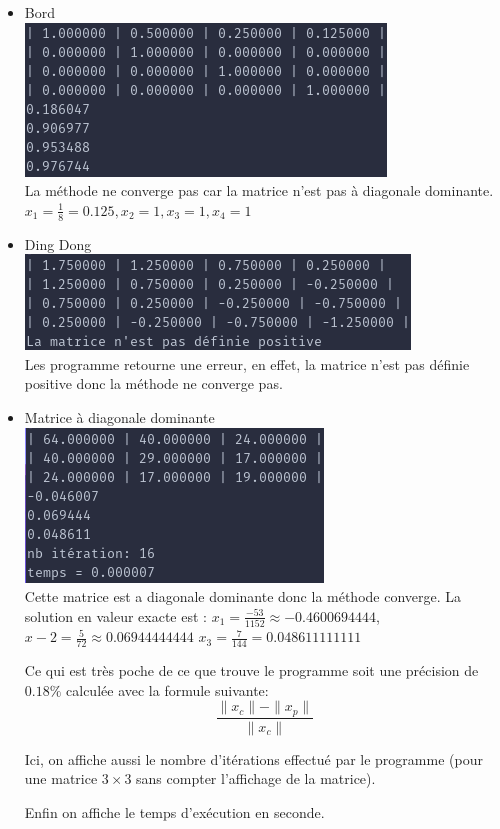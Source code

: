 \documentclass[a4paper]{article}
\begin{document}
\begin{itemize}
\item Bord \\
  \includegraphics[scale=0.5]{./img/cholesky/bord.png} \\
  La méthode ne converge pas car la matrice n'est pas à diagonale dominante.
  $x_{1} = \frac{1}{8} = 0.125 , x_{2} = 1 , x_{3} = 1 , x_{4} = 1$
\item Ding Dong \\
  \includegraphics[scale=0.5]{./img/cholesky/ding_dong.png} \\
  Les programme retourne une erreur, en effet, la matrice n'est pas définie
  positive donc la méthode ne converge pas.
\item Matrice à diagonale dominante \\
  \includegraphics[scale=0.5]{./img/cholesky/chocho_test_final.png} \\
  Cette matrice est a diagonale dominante donc la méthode converge. La solution
  en valeur exacte est :
  \quad$x_{1} = \frac{-53}{1152} \approx -0.4600694444$,
  \quad$x-{2} = \frac{5}{72} \approx 0.06944444444$
  \quad$x_{3} = \frac{7}{144} = 0.048611111111$
  
  Ce qui est très poche de ce que trouve le programme soit une
  précision de $0.18\%$ calculée avec la formule suivante:
  \[\frac{\parallel x_{c} \parallel - \parallel x_{p} \parallel}{\parallel x_{c}
    \parallel}\]
  
  Ici, on affiche aussi le nombre d'itérations effectué par le programme (pour
  une matrice $3 \times 3$ sans compter l'affichage de la matrice).

  Enfin on affiche le temps d’exécution en seconde.
\end{itemize}
\end{document}
